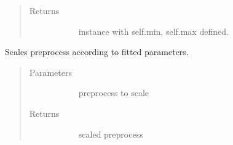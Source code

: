 \documentclass[letterpaper,10pt,english]{sphinxmanual}
\begin{document}
\begin{fulllineitems}
\begin{fulllineitems}
\begin{quote}
\begin{description}
\begin{description}
\end{description}

\item[{Returns}] \leavevmode\begin{description}
\item[{}] \leavevmode
instance with self.min, self.max defined.

\end{description}

\end{description}\end{quote}

\end{fulllineitems}


\begin{fulllineitems}
\label{\detokenize{autoapi/src/utils/preprocess/index:src.utils.preprocess.MinMaxScaler.transform}}
Scales preprocess according to fitted parameters.
\begin{quote}\begin{description}
\item[{Parameters}] \leavevmode\begin{description}
\item[{}] \leavevmode{[}\sphinxcode{\sphinxupquote{np.array}}{]}
preprocess to scale

\end{description}

\item[{Returns}] \leavevmode\begin{description}
\item[{}] \leavevmode
scaled preprocess

\end{description}

\end{description}\end{quote}

\end{fulllineitems}



\end{fulllineitems}
\end{document}
